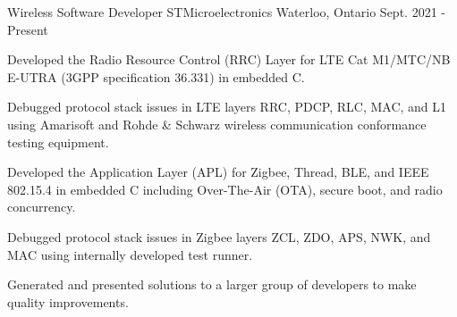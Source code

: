 
\begin{cventries}

  \cventry
    {Wireless Software Developer} %
    {STMicroelectronics} %
    {Waterloo, Ontario} %
    {Sept. 2021 - Present} %
    {
      \begin{cvitems} %
        \item {Developed the Radio Resource Control (RRC) Layer for LTE Cat M1/MTC/NB E-UTRA (3GPP specification 36.331) in embedded C.}
        \item {Debugged protocol stack issues in LTE layers RRC, PDCP, RLC, MAC, and L1 using Amarisoft and Rohde \& Schwarz wireless communication conformance testing equipment.}
        \item {Developed the Application Layer (APL) for Zigbee, Thread, BLE, and IEEE 802.15.4 in embedded C including Over-The-Air (OTA), secure boot, and radio concurrency.}
		\item {Debugged protocol stack issues in Zigbee layers ZCL, ZDO, APS, NWK, and MAC using internally developed test runner.}
        \item {Generated and presented solutions to a larger group of developers to make quality improvements.}
      \end{cvitems}
    }


\end{cventries}
